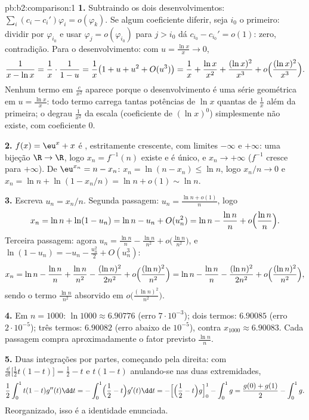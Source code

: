 \begin{solution}{pb:b2:comparison:1}
\textbf{1.} Subtraindo os dois desenvolvimentos: $\sum_i (c_i -
c_i')\varphi_i = o(\varphi_k)$. Se algum coeficiente diferir, seja
$i_0$ o primeiro: dividir por $\varphi_{i_0}$ e usar
$\varphi_j = o(\varphi_{i_0})$ para $j > i_0$ dá $c_{i_0} -
c_{i_0}' = o(1)$: zero, contradição. Para o desenvolvimento: com
$u = \frac{\ln x}x \to 0$,
\[
\frac{1}{x - \ln x} = \frac1x\cdot\frac{1}{1 - u}
= \frac1x\bigl(1 + u + u^2 + O(u^3)\bigr)
= \frac1x + \frac{\ln x}{x^2} + \frac{(\ln x)^2}{x^3} +
o\Bigl(\frac{(\ln x)^2}{x^3}\Bigr).
\]
Nenhum termo em $\frac c{x^2}$ aparece porque o desenvolvimento é uma
série geométrica em $u = \frac{\ln x}{x}$: todo termo carrega tantas
potências de $\ln x$ quantas de $\frac1x$ além da primeira; o
degrau $\frac1{x^2}$ da escala (coeficiente de $(\ln x)^0$) simplesmente
não existe, com coeficiente $0$.

\textbf{2.} $f(x) = \eu^x + x$ é , estritamente
crescente, com limites $-\infty$ e $+\infty$: uma bijeção
$\R \to \R$, logo $x_n = f^{-1}(n)$ existe e é único, e
$x_n \to +\infty$ ($f^{-1}$ cresce para $+\infty$). De
$\eu^{x_n} = n - x_n$: $x_n = \ln(n - x_n) \leq \ln n$, logo
$x_n/n \to 0$ e $x_n = \ln n + \ln(1 - x_n/n) = \ln n + o(1)
\sim \ln n$.

\textbf{3.} Escreva $u_n = x_n/n$. Segunda passagem: $u_n = \frac{\ln n
+ o(1)}{n}$, logo
\[
x_n = \ln n + \ln(1 - u_n) = \ln n - u_n + O(u_n^2)
= \ln n - \frac{\ln n}{n} + o\Bigl(\frac{\ln n}n\Bigr).
\]
Terceira passagem: agora $u_n = \frac{\ln n}{n} - \frac{\ln n}{n^2} +
o\bigl(\frac{\ln n}{n^2}\bigr)$, e $\ln(1 - u_n) = -u_n -
\frac{u_n^2}2 + O(u_n^3)$:
\[
x_n = \ln n - \frac{\ln n}n + \frac{\ln n}{n^2}
- \frac{(\ln n)^2}{2n^2} + o\Bigl(\frac{(\ln
n)^2}{n^2}\Bigr)
= \ln n - \frac{\ln n}{n} - \frac{(\ln n)^2}{2n^2} +
o\Bigl(\frac{(\ln n)^2}{n^2}\Bigr),
\]
sendo o termo $\frac{\ln n}{n^2}$ absorvido em
$o\bigl(\frac{(\ln n)^2}{n^2}\bigr)$.

\textbf{4.} Em $n = 1000$: $\ln 1000 \approx 6.90776$ (erro
$7\cdot10^{-3}$); dois termos: $6.90085$ (erro
$2\cdot10^{-5}$); três termos: $6.90082$ (erro abaixo de
$10^{-5}$), contra $x_{1000} \approx 6.90083$. Cada passagem compra
aproximadamente o fator previsto $\frac{\ln n}{n}$.

\textbf{5.} Duas integrações por partes, começando pela direita:
com $\frac{\dd}{\dd t}\bigl[\tfrac12t(1-t)\bigr] = \tfrac12 -
t$ e $t(1-t)$ anulando-se nas duas extremidades,
\[
\frac12\int_0^1 t(1-t)g''(t)\dd t
= -\int_0^1\Bigl(\frac12 - t\Bigr)g'(t)\dd t
= -\Bigl[\Bigl(\frac12 - t\Bigr)g\Bigr]_0^1 - \int_0^1 g
= \frac{g(0) + g(1)}2 - \int_0^1 g .
\]
Reorganizado, isso é a identidade enunciada.


\end{solution}
